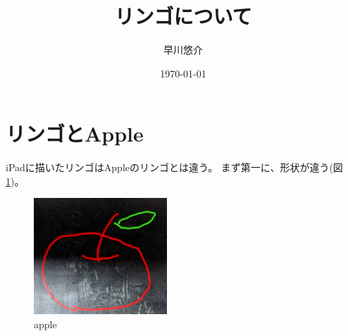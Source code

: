 \documentclass[11pt,a4paper]{jsarticle}
\title{リンゴについて}
\author{早川悠介}
\date{\today}
\begin{document}
\maketitle
%
%
\section{リンゴとApple}
iPadに描いたリンゴはAppleのリンゴとは違う。
まず第一に、形状が違う(図\ref{fig:apple})。

\begin{figure}[htbp]
\begin{center}
\includegraphics[width=50mm]{apple.eps}
\end{center}
\caption{apple}
\label{fig:apple}
\end{figure}


%
%
\end{document}
